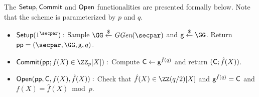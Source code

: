 The $\textsf{{Setup}}, \textsf{{Commit}}$ and $\textsf{{Open}}$ functionalities are presented formally below. Note that the scheme is parameterized by $p$ and $q$.




\begin{itemize}
\item $\pro{Setup}(1^\secpar):$ Sample $ \GG \sample \ggen(\secpar)$
			and $ \gr{g} \sample \GG$. Return $\params = (\secpar,\GG,\gr{g}, q)$.
\item $\pro{Commit}(\params;f(X) \in \ZZ_p[X]):$ Compute $\mathsf{C} \gets \mathsf{g}^{\hat{f}(q)}$ and return $(\mathsf{C};\hat{f}(X))$.
\item $\textsf{{Open}}(\textsf{pp},\mathsf{C}, f(X), \hat{f}(X)):$ Check that $\hat{f}(X)\in \ZZ(q/2)[X]$ and $\mathsf{g}^{\hat{f}(q)} = \mathsf{C}$ and $f(X) = \hat{f}(X) \bmod p$. 
\end{itemize}

